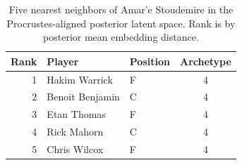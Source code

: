 \begin{table}[htbp]
  \centering\small
  \begin{tabular}{rllc}
    \toprule
    Rank & Player & Position & Archetype \\
    \midrule
    1 & Hakim Warrick & F & 4 \\
    2 & Benoit Benjamin & C & 4 \\
    3 & Etan Thomas & F & 4 \\
    4 & Rick Mahorn & C & 4 \\
    5 & Chris Wilcox & F & 4 \\
    \bottomrule
  \end{tabular}
  \caption{Five nearest neighbors of Amar'e Stoudemire in the Procrustes-aligned posterior latent space. Rank is by posterior mean embedding distance.}
  \label{tab:Amar_e_Stoudemire_neighbors}
\end{table}

